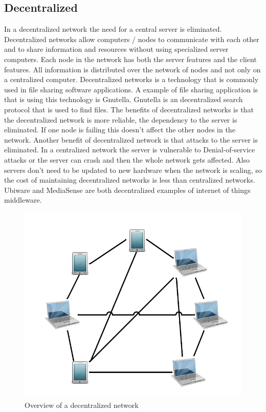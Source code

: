 \subsection{Decentralized}
In a decentralized network the need for a central server is eliminated. Decentralized networks allow computers / nodes to communicate with each other and to share information and resources without using specialized server computers. Each node in the network has both the server features and the client features. All information is distributed over the network of nodes and not only on a centralized computer. Decentralized networks is a technology that is commonly used in file sharing software applications. A example of file sharing application is that is using this technology is Gnutella. Gnutella is an decentralized search protocol that is used to find files. The benefits of decentralized networks is that the decentralized network is more reliable, the dependency to the server is eliminated. If one node is failing this doesn't affect the other nodes in the network. Another benefit of decentralized network is that attacks to the server is eliminated. In a centralized network the server is vulnerable to Denial-of-service attacks or the server can crash and then the whole network gets affected. Also servers don't need to be updated to new hardware when the network is scaling, so the cost of maintaining decentralized networks is less than centralized networks. Ubiware \cite{osterle2010memorandum} and MediaSense \cite{TheMediaSenseFramework} are both decentralized examples of internet of things middleware. 


\begin{figure}[t]
	\centering
    	\includegraphics[scale=0.25]{part_2/sharing_the_information/Decentralized.png}
		\caption{Overview of a decentralized network} 
\end{figure}
